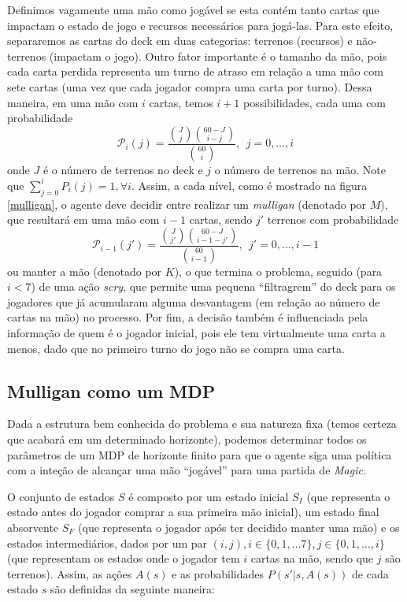 Definimos vagamente uma mão como jogável se esta contém tanto cartas que
impactam o estado de jogo e recursos necessários para jogá-las.
Para este efeito, separaremos as cartas do deck em duas categorias:
terrenos (recursos) e não-terrenos (impactam o jogo).
Outro fator importante é o tamanho da mão, pois cada carta perdida
representa um turno de atraso em relação a uma mão com sete cartas (uma
vez que cada jogador compra
uma carta por turno). Dessa maneira, em uma mão com $i$ cartas, temos
$i+1$ possibilidades, cada uma com probabilidade
\begin{equation} \label{eq:stateprob} \mathcal{P}_i(j) =
\frac{\binom{J}{j}\binom{60 - J}{i - j}}{\binom{60}{i}}, \ \
j = 0,\ldots, i \end{equation} onde $J$ é o número de terrenos no deck
e $j$ o
número de terrenos
na mão. Note que $\sum_{j=0}^{i}P_i(j) = 1, \forall i$. Assim, a cada nível, como é mostrado na figura \ref{mulligan}, o
agente deve decidir entre realizar um \textit{mulligan}
(denotado por $M$), que resultará em uma mão com $i-1$ cartas, sendo $j'$
terrenos com probabilidade
 \[ \mathcal{P}_{i - 1}(j') = \frac{\binom{J}{j'}\binom{60 - J}{i - 1 -
j'}}{\binom{60}{i - 1}}, \ \  j' = 0,\ldots, i - 1\]
 ou manter a mão (denotado por $K$), o que termina o problema, seguido
(para $i < 7$) de uma ação \textit{scry}, que permite uma pequena
``filtragrem''
 do deck para os jogadores que já acumularam alguma desvantagem (em
relação ao número de cartas na mão) no processo. Por fim, a decisão
também é influenciada
 pela informação de quem é o jogador inicial, pois ele tem virtualmente
uma carta a menos, dado que no primeiro turno do jogo não se compra uma
carta.

\subsection{Mulligan como um MDP}

Dada a estrutura bem conhecida do problema e sua natureza fixa (temos certeza que acabará em um
determinado horizonte), podemos determinar todos os parâmetros de um MDP de horizonte finito para
que o agente siga uma política com a inteção de alcançar uma mão ``jogável'' para uma partida de
\textit{Magic}.

O conjunto de estados $S$ é composto por um estado inicial $S_I$ (que representa o estado antes
do jogador comprar a sua primeira mão inicial), um estado final absorvente $S_F$ (que representa
o jogador após ter decidido manter uma mão) e os estados intermediários, dados por um par $(i, j),
i \in \{ 0, 1, \ldots 7\}, j \in \{ 0, 1, \ldots, i \}$ (que representam os estados onde o jogador
tem $i$ cartas na mão, sendo que $j$ são terrenos). Assim, as ações $A(s)$ e as probabilidades
$P(s'|s, A(s))$ de cada estado $s$ são definidas da seguinte maneira:

